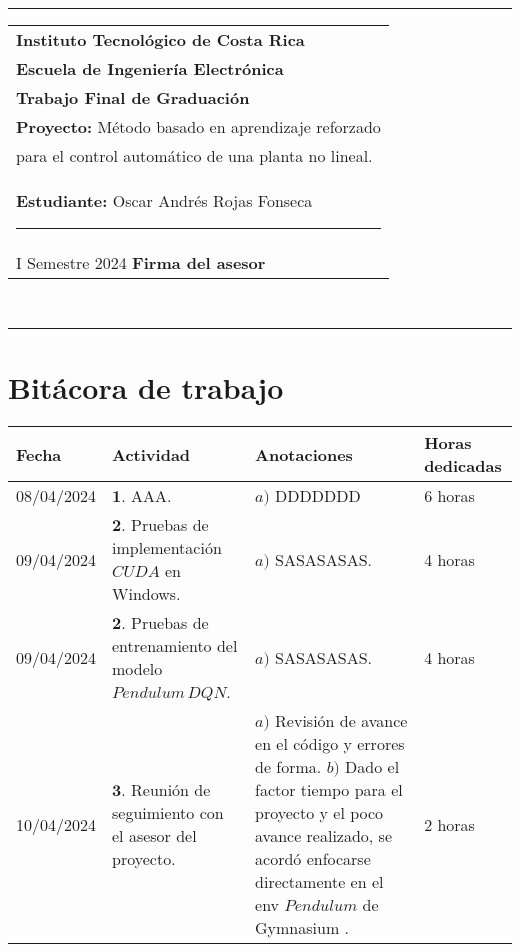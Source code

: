 \documentclass[12pt]{article}
\begin{document}
\hfill\\
\rule{\textwidth}{1.5pt}

\begin{minipage}[t]{85mm}
  \begin{tabular}{l}
    \textbf{\large Instituto Tecnológico de Costa Rica} \\  
    \textbf{Escuela de Ingeniería Electrónica} \\
    \textbf{Trabajo Final de Graduación} \\
    \textbf{Proyecto:} Método basado en aprendizaje reforzado \\para el control automático de una planta no lineal. \\
    \textbf{Estudiante:} Oscar Andrés Rojas Fonseca \hspace{3cm}\rule{4.5cm}{1.5pt}\\
    I Semestre 2024 \hspace{8.5cm}\textbf{Firma del asesor}
  \end{tabular}
\end{minipage}
\hfill\\
\rule{\textwidth}{1.5pt}


\section*{Bitácora de trabajo}

\begin{minipage}[h]{\textwidth}
	\centering
	\begin{tabularx}{\textwidth}{|p{2cm}|X|X|p{2cm}|} 
		\hline
		\rowcolor{encabezado}
		\textbf{Fecha} & 
		\textbf{Actividad} & 
		\textbf{Anotaciones} & 
		\textbf{Horas dedicadas} \\ \hline
	 	08/04/2024 & 
	 	$\mathbf{1}.$ AAA. & 
	 	$a)$ DDDDDDD \newline & 
	 	6 horas \\
		09/04/2024 & 
	 	$\mathbf{2}.$ Pruebas de implementación $CUDA$ en Windows. &
	 	$a)$ SASASASAS. \newline & 
	 	4 horas \\
		09/04/2024 & 
	 	$\mathbf{2}.$ Pruebas de entrenamiento del modelo $Pendulum\, DQN$. &
	 	$a)$ SASASASAS. \newline & 
	 	4 horas \\
	 	10/04/2024 & 
	 	$\mathbf{3}.$ Reunión de seguimiento con el asesor del proyecto. & 
	 	$a)$ Revisión de avance en el código y errores de forma.  \newline
	 	$b)$ Dado el factor tiempo para el proyecto y el poco avance realizado, se acordó enfocarse directamente en el env $Pendulum$ de Gymnasium \cite{gym}.  \newline & 
	 	2 horas \\
	 	\hline
	\end{tabularx}
\end{minipage}	 	
	 	
\end{document}
